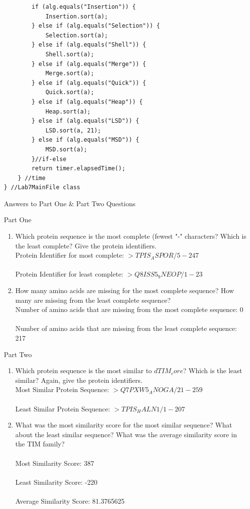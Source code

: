 \documentclass{article}
\begin{document}
\begin{lstlisting}
        if (alg.equals("Insertion")) {
            Insertion.sort(a);
        } else if (alg.equals("Selection")) {
            Selection.sort(a);
        } else if (alg.equals("Shell")) {
            Shell.sort(a);
        } else if (alg.equals("Merge")) {
            Merge.sort(a);
        } else if (alg.equals("Quick")) {
            Quick.sort(a);
        } else if (alg.equals("Heap")) {
            Heap.sort(a);
        } else if (alg.equals("LSD")) {
            LSD.sort(a, 21);
        } else if (alg.equals("MSD")) {
            MSD.sort(a);
        }//if-else
        return timer.elapsedTime();
    } //time
} //Lab7MainFile class
\end{lstlisting}
\begin{center}
Answers to Part One \& Part Two Questions \\
\end{center}
\noindent
Part One
\begin{enumerate}
\item Which protein sequence is the most complete (fewest "-" characters? Which is the least complete? Give the protein identifiers.
\\
Protein Identifier for most complete: $>TPIS_ASPOR/5-247$
\\
\\
Protein Identifier for least complete: $>Q8ISS5_9NEOP/1-23$
\\
\item How many amino acids are missing for the most complete sequence? How many are missing from the least complete sequence?
\\
Number of amino acids that are missing from the most complete sequence: 0
\\
\\
Number of amino acids that are missing from the least complete sequence: 217
\end{enumerate}
\noindent
Part Two
\begin{enumerate}
\item Which protein sequence is the most similar to $dTIM_core$? Which is the least similar? Again, give the protein identifiers.
\\
Most Similar Protein Sequence: $>Q7PXW5_ANOGA/21-259$
\\
\\
Least Similar Protein Sequence: $>TPIS_HALN1/1-207$
\\
\item What was the most similarity score for the most similar sequence? What about the least similar sequence? What was the average similarity score in the TIM family?
\\
\\
Most Similarity Score: 387
\\
\\
Least Similarity Score: -220
\\
\\
Average Similarity Score: 81.3765625
\end{enumerate}
\end{document}
